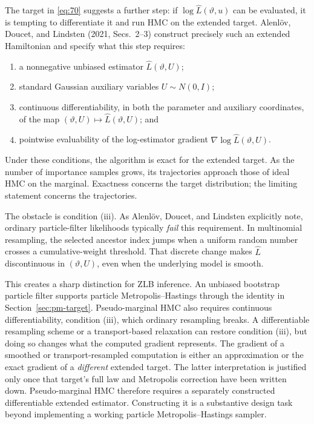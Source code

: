\documentclass[11pt]{article}
\begin{document}
The target in \eqref{eq:70} suggests a further step: if $\log\widehat L(\vartheta,u)$ can be evaluated, it is tempting to differentiate it and run HMC on the extended target. Alenl\"ov, Doucet, and Lindsten (2021, Secs.~2--3) construct precisely such an extended Hamiltonian and specify what this step requires:
\begin{enumerate}
\item a nonnegative unbiased estimator $\widehat L(\vartheta,U)$;
\item standard Gaussian auxiliary variables $U\sim N(0,I)$;
\item continuous differentiability, in both the parameter and auxiliary coordinates, of the map
      $(\vartheta,U)\mapsto\widehat L(\vartheta,U)$; and
\item pointwise evaluability of the log-estimator gradient $\nabla\log\widehat L(\vartheta,U)$.
\end{enumerate}
Under these conditions, the algorithm is exact for the extended target. As the number of importance samples grows, its trajectories approach those of ideal HMC on the marginal. Exactness concerns the target distribution; the limiting statement concerns the trajectories.

The obstacle is condition (iii). As Alenl\"ov, Doucet, and Lindsten explicitly note, ordinary particle-filter likelihoods typically \emph{fail} this requirement. In multinomial resampling, the selected ancestor index jumps when a uniform random number crosses a cumulative-weight threshold. That discrete change makes $\widehat L$ discontinuous in $(\vartheta,U)$, even when the underlying model is smooth.

This creates a sharp distinction for ZLB inference. An unbiased bootstrap particle filter supports particle Metropolis--Hastings through the identity in Section~\ref{sec:pm-target}. Pseudo-marginal HMC also requires continuous differentiability, condition (iii), which ordinary resampling breaks. A differentiable resampling scheme or a transport-based relaxation can restore condition (iii), but doing so changes what the computed gradient represents. The gradient of a smoothed or transport-resampled computation is either an approximation or the exact gradient of a \emph{different} extended target. The latter interpretation is justified only once that target's full law and Metropolis correction have been written down. Pseudo-marginal HMC therefore requires a separately constructed differentiable extended estimator. Constructing it is a substantive design task beyond implementing a working particle Metropolis--Hastings sampler.
\end{document}
